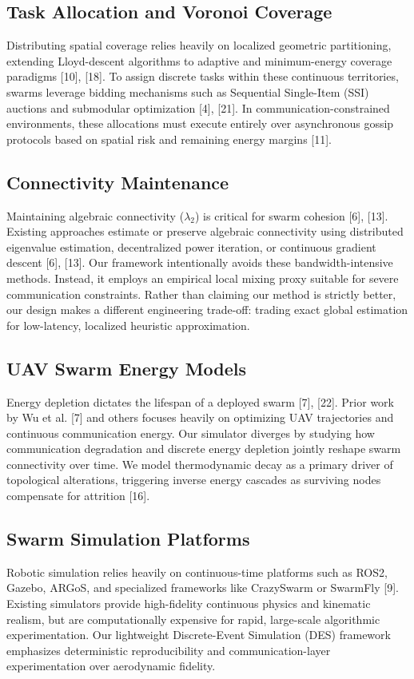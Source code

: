 \documentclass[conference]{IEEEtran}
\begin{document}
\subsection{Task Allocation and Voronoi Coverage}
Distributing spatial coverage relies heavily on localized geometric partitioning, extending Lloyd-descent algorithms to adaptive and minimum-energy coverage paradigms [10], [18]. To assign discrete tasks within these continuous territories, swarms leverage bidding mechanisms such as Sequential Single-Item (SSI) auctions and submodular optimization [4], [21]. In communication-constrained environments, these allocations must execute entirely over asynchronous gossip protocols based on spatial risk and remaining energy margins [11].

\subsection{Connectivity Maintenance}
Maintaining algebraic connectivity ($\lambda_2$) is critical for swarm cohesion [6], [13]. Existing approaches estimate or preserve algebraic connectivity using distributed eigenvalue estimation, decentralized power iteration, or continuous gradient descent [6], [13]. Our framework intentionally avoids these bandwidth-intensive methods. Instead, it employs an empirical local mixing proxy suitable for severe communication constraints. Rather than claiming our method is strictly better, our design makes a different engineering trade-off: trading exact global estimation for low-latency, localized heuristic approximation.

\subsection{UAV Swarm Energy Models}
Energy depletion dictates the lifespan of a deployed swarm [7], [22]. Prior work by Wu et al. [7] and others focuses heavily on optimizing UAV trajectories and continuous communication energy. Our simulator diverges by studying how communication degradation and discrete energy depletion jointly reshape swarm connectivity over time. We model thermodynamic decay as a primary driver of topological alterations, triggering inverse energy cascades as surviving nodes compensate for attrition [16].

\subsection{Swarm Simulation Platforms}
Robotic simulation relies heavily on continuous-time platforms such as ROS2, Gazebo, ARGoS, and specialized frameworks like CrazySwarm or SwarmFly [9]. Existing simulators provide high-fidelity continuous physics and kinematic realism, but are computationally expensive for rapid, large-scale algorithmic experimentation. Our lightweight Discrete-Event Simulation (DES) framework emphasizes deterministic reproducibility and communication-layer experimentation over aerodynamic fidelity.
\end{document}
